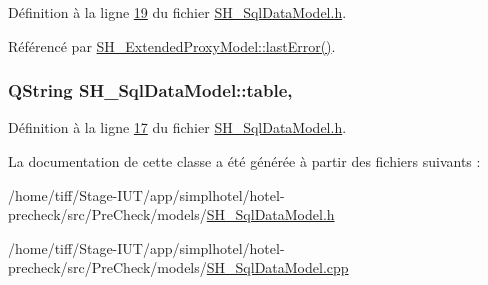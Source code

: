 Définition à la ligne \hyperlink{SH__SqlDataModel_8h_source_l00019}{19} du fichier \hyperlink{SH__SqlDataModel_8h_source}{S\-H\-\_\-\-Sql\-Data\-Model.\-h}.



Référencé par \hyperlink{classSH__ExtendedProxyModel_afb11fa89e1181d88843ea0f7fb3fe654}{S\-H\-\_\-\-Extended\-Proxy\-Model\-::last\-Error()}.

\hypertarget{classSH__SqlDataModel_afd3e2e62c847463c5177ccad35ad4992}{
\subsubsection[{table}]{\setlength{\rightskip}{0pt plus 5cm}Q\-String S\-H\-\_\-\-Sql\-Data\-Model\-::table\hspace{0.3cm}{\ttfamily [read]}, {\ttfamily [write]}}}\label{classSH__SqlDataModel_afd3e2e62c847463c5177ccad35ad4992}


Définition à la ligne \hyperlink{SH__SqlDataModel_8h_source_l00017}{17} du fichier \hyperlink{SH__SqlDataModel_8h_source}{S\-H\-\_\-\-Sql\-Data\-Model.\-h}.



La documentation de cette classe a été générée à partir des fichiers suivants \-:\begin{DoxyCompactItemize}
\item 
/home/tiff/\-Stage-\/\-I\-U\-T/app/simplhotel/hotel-\/precheck/src/\-Pre\-Check/models/\hyperlink{SH__SqlDataModel_8h}{S\-H\-\_\-\-Sql\-Data\-Model.\-h}\item 
/home/tiff/\-Stage-\/\-I\-U\-T/app/simplhotel/hotel-\/precheck/src/\-Pre\-Check/models/\hyperlink{SH__SqlDataModel_8cpp}{S\-H\-\_\-\-Sql\-Data\-Model.\-cpp}\end{DoxyCompactItemize}
